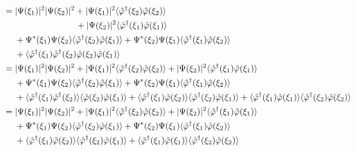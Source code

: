 \documentclass[dvipdfmx, 11pt, a4paper]{jsarticle}
\numberwithin{equation}{section}
\theoremstyle{definition}
\begin{document}
\begin{derivationBox}
\begin{align}
            &= |\Psi (\xi_1)|^2 |\Psi (\xi_2)|^2 + |\Psi (\xi_1)|^2 \langle  \hat{\varphi}^\dagger(\xi_2) \hat{\varphi}(\xi_2)\rangle  \notag \\
            &\ \ \ \ \ \ \ \ \ \ \ \ \ \ \ \ \ \ \ \ \ \ \ \ \  + |\Psi (\xi_2)|^2 \langle \hat{\varphi}^\dagger(\xi_1) \hat{\varphi}(\xi_1)\rangle  \notag \\
            &\ \ \ \ + \Psi^* (\xi_1) \Psi(\xi_2) \langle \hat{\varphi}^\dagger(\xi_2) \hat{\varphi}(\xi_1)\rangle  + \Psi^* (\xi_2) \Psi(\xi_1) \langle \hat{\varphi}^\dagger(\xi_1) \hat{\varphi}(\xi_2)\rangle \notag \\
            &\ \ \ \ + \langle \hat{\varphi}^\dagger(\xi_1) \hat{\varphi}^\dagger(\xi_2) \hat{\varphi}(\xi_2) \hat{\varphi}(\xi_1)\rangle  \notag \\
            &=  |\Psi (\xi_1)|^2 |\Psi (\xi_2)|^2 + |\Psi (\xi_1)|^2 \langle \hat{\varphi}^\dagger(\xi_2) \hat{\varphi}(\xi_2)\rangle   + |\Psi (\xi_2)|^2 \langle  \hat{\varphi}^\dagger(\xi_1) \hat{\varphi}(\xi_1)\rangle  \notag \\
            &\ \ \ \ + \Psi^* (\xi_1) \Psi(\xi_2) \langle \hat{\varphi}^\dagger(\xi_2) \hat{\varphi}(\xi_1)\rangle + \Psi^* (\xi_2) \Psi(\xi_1) \langle \hat{\varphi}^\dagger(\xi_1) \hat{\varphi}(\xi_2)\rangle \notag \\
            &\ \ \ \ + \langle \hat{\varphi}^\dagger(\xi_1) \hat{\varphi}^\dagger(\xi_2)\rangle \langle  \hat{\varphi}(\xi_2) \hat{\varphi}(\xi_1)\rangle  + \langle \hat{\varphi}^\dagger(\xi_1) \hat{\varphi}(\xi_2)\rangle \langle  \hat{\varphi}^\dagger(\xi_2) \hat{\varphi}(\xi_1)\rangle  + \langle \hat{\varphi}^\dagger(\xi_1) \hat{\varphi}(\xi_1)\rangle \langle  \hat{\varphi}^\dagger(\xi_2) \hat{\varphi}(\xi_2)\rangle  \notag \\
            &=  |\Psi (\xi_1)|^2 |\Psi (\xi_2)|^2 + |\Psi (\xi_1)|^2 \langle  \hat{\varphi}^\dagger(\xi_2) \hat{\varphi}(\xi_2)\rangle    + |\Psi (\xi_2)|^2 \langle  \hat{\varphi}^\dagger(\xi_1) \hat{\varphi}(\xi_1)\rangle  \notag \\
            &\ \ \ \ + \Psi^* (\xi_1) \Psi(\xi_2) \langle \hat{\varphi}^\dagger(\xi_2) \hat{\varphi}(\xi_1)\rangle  + \Psi^* (\xi_2) \Psi(\xi_1) \langle \hat{\varphi}^\dagger(\xi_1) \hat{\varphi}(\xi_2)\rangle  \notag \\
            &\ \ \ \ + \langle \hat{\varphi}^\dagger(\xi_1) \hat{\varphi}(\xi_2)\rangle \langle  \hat{\varphi}^\dagger(\xi_2) \hat{\varphi}(\xi_1)\rangle  + \langle \hat{\varphi}^\dagger(\xi_1) \hat{\varphi}(\xi_1)\rangle \langle  \hat{\varphi}^\dagger(\xi_2) \hat{\varphi}(\xi_2)\rangle  \notag \\

\end{align}
\end{derivationBox}
\end{document}
